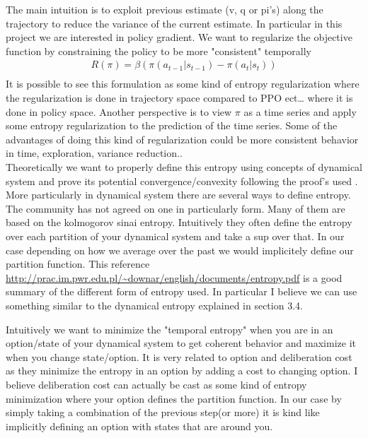  The main intuition is to exploit previous estimate (v, q or pi’s) along the trajectory to reduce the variance of the current estimate. In particular in this project we are interested in policy gradient. We want to regularize the objective function by constraining the policy to be more "consistent" temporally 
\begin{equation}
\begin{split}
    R(\pi) = \beta ( \pi(a_{t-1}|s_{t-1}) - \pi(a_t|s_t)) \\
\end{split}
\end{equation}
It is possible to see this formulation as some kind of entropy regularization where the regularization is done in trajectory space compared to PPO ect… where it is done in policy space. Another perspective is to view $\pi$ as a time series and apply some entropy regularization to the prediction of the time series. Some of the advantages of doing this kind of regularization could be more consistent behavior in time, exploration, variance reduction.. \\
Theoretically we want to properly define this entropy using concepts of dynamical system and prove its potential convergence/convexity following the proof's used \cite{neu2017unified}.\\
More particularly in dynamical system there are several ways to define entropy. The community has not agreed on one in particularly form. Many of them are based on the kolmogorov sinai entropy. Intuitively they often define the entropy over each partition of your dynamical system and take a sup over that. In our case depending on how we average over the past we would implicitely define our partition function. This reference \url{http://prac.im.pwr.edu.pl/~downar/english/documents/entropy.pdf} is a good summary of the different form of entropy used. In particular I believe we can use something similar to the dynamical entropy explained in section 3.4.

Intuitively we want to minimize the "temporal entropy" when you are in an option/state of your dynamical system to get coherent behavior and maximize it when you change state/option. It is very related to option and deliberation cost \cite{harb2017waiting} as they minimize the entropy in an option by adding a cost to changing option. I believe deliberation cost can actually be cast as some kind of entropy minimization where your option defines the partition function. In our case by simply taking a combination of the previous step(or more) it is kind like implicitly defining an option with states that are around you.

